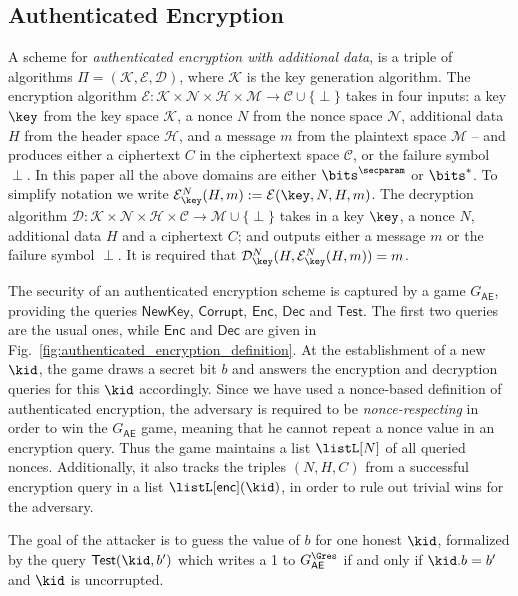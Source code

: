 \subsection{Authenticated Encryption}\label{sec:AE_definition}
A scheme for \emph{authenticated encryption with additional data},
is a triple of algorithms $\Pi = (\mathcal{K}, \mathcal{E}, \mathcal{D})$,
where $\mathcal{K}$ is the key generation algorithm.
The encryption algorithm $\mathcal{E} \colon \mathcal{K \times N \times H \times M} \to \mathcal{C} \cup \lbrace \perp \rbrace$ 
takes in four inputs: a key $\key$ from the key space $\mathcal{K}$, 
a nonce $N$ from the nonce space $\mathcal{N}$, 
additional data $H$ from the header space $\mathcal{H}$,
and a message $m$ from the plaintext space $\mathcal{M}$ --
and produces either a ciphertext $C$ in the ciphertext space $\mathcal{C}$, or the failure symbol $\perp$. 
In this paper all the above domains are either $\bits^\secparam$ or $\bits^*$. 
To simplify notation we write $\mathcal{E}_\key^N(H,m) := \mathcal{E}(\key, N, H, m)$.
The decryption algorithm $\mathcal{D} \colon \mathcal{K \times N \times H \times C} \to \mathcal{M} \cup \lbrace \perp \rbrace$
takes in a key $\key$, a nonce $N$, additional data $H$ and a ciphertext $C$;
and outputs either a message $m$ or the failure symbol $\perp$.
It is required that $\mathcal{D}_\key^N(H, \mathcal{E}_\key^N(H,m)) = m$.

The security of an authenticated encryption scheme is captured by a game $G_\mathsf{AE}$,
providing the queries $\mathsf{NewKey}$, $\mathsf{Corrupt}$, $\mathsf{Enc}$, $\mathsf{Dec}$ and $\mathsf{Test}$. 
The first two queries are the usual ones, 
while $\mathsf{Enc}$ and $\mathsf{Dec}$ are given in Fig.~\ref{fig:authenticated_encryption_definition}.
At the establishment of a new $\kid$, 
the game draws a secret bit $b$ and answers the encryption and decryption queries for this $\kid$ accordingly. 
Since we have used a nonce-based definition of authenticated encryption,
the adversary is required to be \emph{nonce-respecting} in order to win the $G_\mathsf{AE}$ game, 
meaning that he cannot repeat a nonce value in an encryption query.
Thus the game maintains a list $\listL[N]$ of all queried nonces.
Additionally, it also tracks the triples $(N, H, C)$ from a successful encryption query in a list $\listL[\mathsf{enc}](\kid)$,
in order to rule out trivial wins for the adversary. 
   
The goal of the attacker is to guess the value of $b$ for one honest $\kid$, 
formalized by the query $\mathsf{Test}(\kid, b')$ which writes a 1 to $G_\mathsf{AE}^\Gres$ if and only if $\kid.b = b'$ and $\kid$ is uncorrupted.

